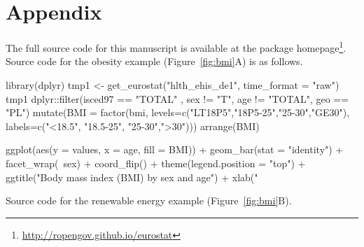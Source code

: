 \address{Przemys{\l}aw Biecek\\
  Faculty of Mathematics and Information Science\\
  Warsaw University of Technology\\
  Koszykowa 75, 00-662 Warsaw\\
  Poland\\
  }

\newpage

\section{Appendix}

The full source code for this manuscript is available at the package homepage\footnote{\url{http://ropengov.github.io/eurostat}}. Source code for the obesity example (Figure~\ref{fig:bmi}A) is as follows.

\begin{example}
  library(dplyr)
  tmp1 <- get_eurostat("hlth_ehis_de1", time_format = "raw")
  tmp1 %
    dplyr::filter(isced97 == "TOTAL" ,
         sex != "T", age != "TOTAL", geo == "PL") %
    mutate(BMI = factor(bmi, 
                        levels=c("LT18P5","18P5-25","25-30","GE30"), 
                        labels=c("<18.5", "18.5-25", "25-30",">30"))) %
    arrange(BMI) %
    
    ggplot(aes(y = values, x = age, fill = BMI)) + geom_bar(stat = "identity") +
      facet_wrap(~sex) + coord_flip() +
      theme(legend.position = "top") +
      ggtitle("Body mass index (BMI) by sex and age") +
      xlab("%
\end{example}


Source code for the renewable energy example (Figure~\ref{fig:bmi}B).

